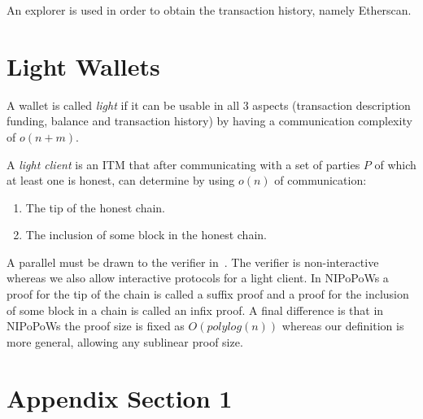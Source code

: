 \documentclass[sigconf,authordraft]{acmart}
\begin{document}
An explorer is used in order to obtain the transaction history, namely Etherscan.

\section{Light Wallets}
\begin{definition}
A wallet is called \emph{light} if it can be usable in all 3 aspects (transaction description funding, balance and transaction history) by having a communication complexity of $o(n+m)$.
\end{definition}

\begin{definition}
A \emph{light client} is an ITM that after communicating with a set of parties $P$ of which at least one is honest, can determine by using $o(n)$ of communication:
\begin{enumerate}
    \item The tip of the honest chain.
    \item The inclusion of some block in the honest chain.
\end{enumerate}
\end{definition}

A parallel must be drawn to the verifier in~\cite{nipopows}. The verifier is non-interactive whereas we also allow interactive protocols for a light client. In NIPoPoWs a proof for the tip of the chain is called a suffix proof and a proof for the inclusion of some block in a chain is called an infix proof. A final difference is that in NIPoPoWs the proof size is fixed as $O(polylog(n))$ whereas our definition is more general, allowing any sublinear proof size.

\begin{acks}
\end{acks}




\appendix

\section{Appendix Section 1}
\end{document}
